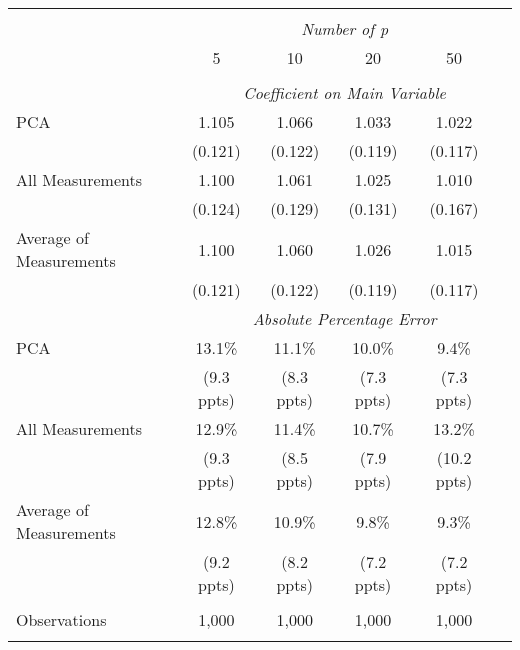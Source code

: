 \begin{table}[!htbp] \centering
\begin{tabular}{@{\extracolsep{5pt}}lccccc}
\\[-1.8ex]\hline
\hline \\[-1.8ex]
& \multicolumn{5}{c}{\textit{Number of p}} \
\cr 
\\[-1.8ex] & 5 & 10 & 20 & 50 \\
\hline \\[-1.8ex]
& \multicolumn{5}{c}{\textit{Coefficient on Main Variable}} \\
 PCA & 1.105 & 1.066 & 1.033 & 1.022  \\
  & (0.121) & (0.122) & (0.119) & (0.117)\\
 All Measurements & 1.100 & 1.061 & 1.025 & 1.010  \\
  & (0.124) & (0.129) & (0.131) & (0.167)\\
 Average of Measurements & 1.100 & 1.060 & 1.026 & 1.015  \\
  & (0.121) & (0.122) & (0.119) & (0.117)\\
& \multicolumn{5}{c}{\textit{Absolute Percentage Error}} \\
  PCA & 13.1\% & 11.1\% & 10.0\% & 9.4\%  \\
   & (9.3 ppts) & (8.3 ppts) & (7.3 ppts) & (7.3 ppts)\\
  All Measurements & 12.9\% & 11.4\% & 10.7\% & 13.2\%  \\
  & (9.3 ppts) & (8.5 ppts) & (7.9 ppts) & (10.2 ppts)\\
  Average of Measurements & 12.8\% & 10.9\% & 9.8\% & 9.3\%  \\
  & (9.2 ppts) & (8.2 ppts) & (7.2 ppts) & (7.2 ppts)\\
\hline \\[-1.8ex]
 Observations & 1,000 & 1,000 & 1,000 & 1,000 & \\
\hline
\hline \\[-1.8ex]
\end{tabular}
\end{table}